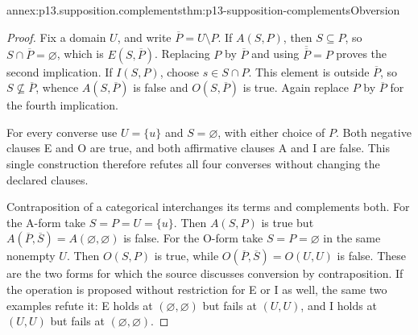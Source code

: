 \begin{annexitem}{annex:p13.supposition.complements}{thm:p13-supposition-complements}{Obversion}
\begin{proof}
Fix a domain \(U\), and write \(\overline P=U\setminus P\).
If \(A(S,P)\), then \(S\subseteq P\), so
\(S\cap\overline P=\varnothing\), which is
\(E(S,\overline P)\). Replacing \(P\) by \(\overline P\)
and using \(\overline{\overline P}=P\) proves the second implication.
If \(I(S,P)\), choose \(s\in S\cap P\). This element is outside
\(\overline P\), so \(S\nsubseteq\overline P\), whence
\(A(S,\overline P)\) is false and \(O(S,\overline P)\) is true.
Again replace \(P\) by \(\overline P\) for the fourth implication.

For every converse use \(U=\{u\}\) and \(S=\varnothing\), with
either choice of \(P\). Both negative clauses E and O are true,
and both affirmative clauses A and I are false. This single construction
therefore refutes all four converses without changing the declared clauses.

Contraposition of a categorical interchanges its terms and complements
both. For the A-form take \(S=P=U=\{u\}\). Then \(A(S,P)\)
is true but \(A(\overline P,\overline S)=A(\varnothing,\varnothing)\)
is false. For the O-form take \(S=P=\varnothing\) in the same
nonempty \(U\). Then \(O(S,P)\) is true, while
\(O(\overline P,\overline S)=O(U,U)\) is false. These are the two
forms for which the source discusses conversion by contraposition.
If the operation is proposed without restriction for E or I as well,
the same two examples refute it: E holds at
\((\varnothing,\varnothing)\) but fails at \((U,U)\), and I holds
at \((U,U)\) but fails at \((\varnothing,\varnothing)\).
\end{proof}
\end{annexitem}


